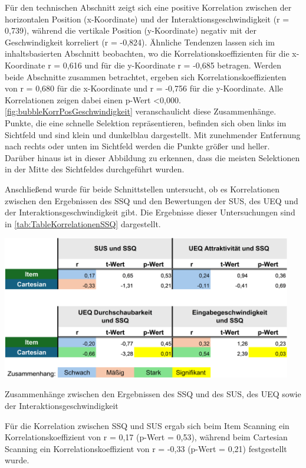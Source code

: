 Für den technischen Abschnitt zeigt sich eine positive Korrelation zwischen der horizontalen Position (x-Koordinate) und der Interaktionsgeschwindigkeit (r = 0,739), während die vertikale Position (y-Koordinate) negativ mit der Geschwindigkeit korreliert (r = -0,824). Ähnliche Tendenzen lassen sich im inhaltsbasierten Abschnitt beobachten, wo die Korrelationskoeffizienten für die x-Koordinate r = 0,616 und für die y-Koordinate r = -0,685 betragen. Werden beide Abschnitte zusammen betrachtet, ergeben sich Korrelationskoeffizienten von r = 0,680 für die x-Koordinate und r = -0,756 für die y-Koordinate. Alle Korrelationen zeigen dabei einen p-Wert <0,000. \autoref{fig:bubbleKorrPosGeschwindigkeit} veranschaulicht diese Zusammenhänge. Punkte, die eine schnelle Selektion repräsentieren, befinden sich oben links im Sichtfeld und sind klein und dunkelblau dargestellt. Mit zunehmender Entfernung nach rechts oder unten im Sichtfeld werden die Punkte größer und heller. Darüber hinaus ist in dieser Abbildung zu erkennen, dass die meisten Selektionen in der Mitte des Sichtfeldes durchgeführt wurden.

Anschließend wurde für beide Schnittstellen untersucht, ob es Korrelationen zwischen den Ergebnissen des SSQ und den Bewertungen der SUS, des UEQ und der Interaktionsgeschwindigkeit gibt. Die Ergebnisse dieser Untersuchungen sind in \autoref{tab:TableKorrelationenSSQ} dargestellt.

\begin{table}[tbh]
    \centering
    \includegraphics[width=0.95\textwidth]{images/Results/Korrelationen-SSQ.png}
    \caption{Zusammenhänge zwischen den Ergebnissen des SSQ und des SUS, des UEQ sowie der Interaktionsgeschwindigkeit}
    \label{tab:TableKorrelationenSSQ}
\end{table}

Für die Korrelation zwischen SSQ und SUS ergab sich beim Item Scanning ein Korrelationskoeffizient von r = 0,17 (p-Wert = 0,53), während beim Cartesian Scanning ein Korrelationskoeffizient von r = -0,33 (p-Wert = 0,21) festgestellt wurde. 

